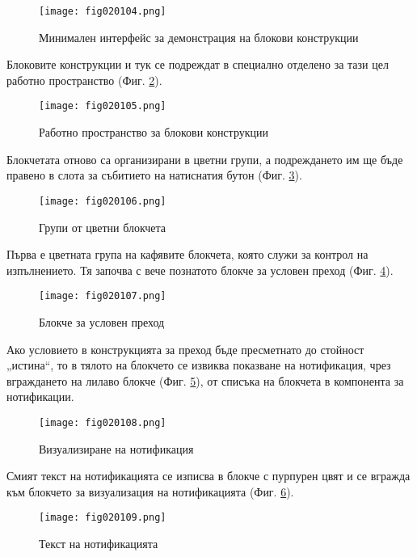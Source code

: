 \begin{figure}[H]
  \centering
  \texttt{[image: fig020104.png]}
  \caption{Минимален интерфейс за демонстрация на блокови конструкции}
\label{fig020104}
\end{figure}

Блоковите конструкции и тук се подреждат в специално отделено за тази цел работно пространство (Фиг. \ref{fig020105}).

\begin{figure}[H]
  \centering
  \texttt{[image: fig020105.png]}
  \caption{Работно пространство за блокови конструкции}
\label{fig020105}
\end{figure}

Блокчетата отново са организирани в цветни групи, а подреждането им ще бъде правено в слота за събитието на натиснатия бутон (Фиг. \ref{fig020106}).

\begin{figure}[H]
  \centering
  \texttt{[image: fig020106.png]}
  \caption{Групи от цветни блокчета}
\label{fig020106}
\end{figure}

Първа е цветната група на кафявите блокчета, която служи за контрол на изпълнението. Тя започва с вече познатото блокче за условен преход (Фиг. \ref{fig020107}).

\begin{figure}[H]
  \centering
  \texttt{[image: fig020107.png]}
  \caption{Блокче за условен преход}
\label{fig020107}
\end{figure}

Ако условието в конструкцията за преход бъде пресметнато до стойност „истина“, то в тялото на блокчето се извиква показване на нотификация, чрез вграждането на лилаво блокче (Фиг. \ref{fig020108}), от списъка на блокчета в компонента за нотификации.

\begin{figure}[H]
  \centering
  \texttt{[image: fig020108.png]}
  \caption{Визуализиране на нотификация}
\label{fig020108}
\end{figure}

Смият текст на нотификацията се изписва в блокче с пурпурен цвят и се вгражда към блокчето за визуализация на нотификацията (Фиг. \ref{fig020109}).

\begin{figure}[H]
  \centering
  \texttt{[image: fig020109.png]}
  \caption{Текст на нотификацията}
\label{fig020109}
\end{figure}

